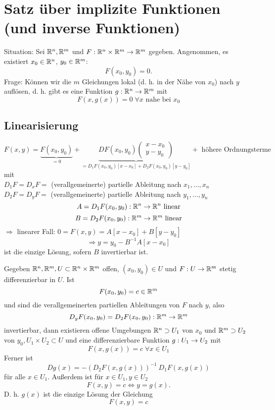 \documentclass[../ana2.tex]{subfiles}
\begin{document}
\setcounter{section}{16}
\section{Satz über implizite Funktionen (und inverse Funktionen)}
Situation: Sei \(\mathbb{R}^n, \mathbb{R}^m\) und \(F:\mathbb{R}^n \times \mathbb{R}^m\rightarrow \mathbb{R}^m\) gegeben. 
Angenommen, es existiert \(x_0 \in \mathbb{R}^n\), \(y_0 \in \mathbb{R}^m\):
\[ F(x_0, y_0) = 0. \]
Frage: Können wir die \( m \) Gleichungen lokal 
(d. h. in der Nähe von \( x_0 \)) nach \(y\) 
auflösen, d. h. gibt es eine Funktion 
\( g:\mathbb{R}^n\rightarrow \mathbb{R}^m \) mit 
\[ F(x, g(x)) = 0 \; \forall x \text{ nahe bei } x_0 \]
\subsection*{Linearisierung} 
\[ F(x,y) = \underbrace{F(x_0, y_0)}_{=0} + \underbrace{DF(x_0, y_0) \begin{pmatrix}
    x - x_0 \\ y - y_0
\end{pmatrix} }_{
    = D_1 F(x_0, y_0)[x - x_0] + D_2 F(x_0, y_0)[y - y_0]
}+ \text{ höhere Ordnungsterme}\]
mit \\
\( D_1 F = D_x F =  \) (verallgemeinerte) 
partielle Ableitung nach \( x_1,\ldots, x_n \)\\
\( D_2F = D_yF = \) (verallgemeinerte) 
partielle Ableitung nach \(y_1, \ldots , y_n \)
\[ A = D_1 F(x_0, y_0):\mathbb{R}^n\rightarrow \mathbb{R}^n \text{ linear} \]
\[ B = D_2 F(x_0, y_0):\mathbb{R}^m\rightarrow \mathbb{R}^m \text{ linear} \]
\( \Rightarrow \) linearer Fall: 
\(0 = F(x, y) = A[x-x_0] + B[y-y_0]\)
\[ \Rightarrow y = y_0 - B^{-1}A[x - x_0] \]
ist die einzige Lösung, sofern \( B \) invertierbar ist.
\begin{satz}
    Gegeben \(\mathbb{R}^n, \mathbb{R}^m, U \subset \mathbb{R}^n \times \mathbb{R}^m\) offen, 
    \((x_0, y_0) \in U\) und \(F:U\rightarrow \mathbb{R}^m\) stetig differenzierbar
    in \(U\). Ist
    \[ F(x_0, y_0) = c \in \mathbb{R}^m \]
    und sind die verallgemeinerten partiellen Ableitungen von \(F\)
    nach \(y\), also
    \[ D_yF(x_0,y_0) = D_2F(x_0, y_0):\mathbb{R}^m\rightarrow \mathbb{R}^m \]
    invertierbar, dann existieren offene Umgebungen \(\mathbb{R}^n \supset U_1\)
    von \(x_0\) und \(\mathbb{R}^m \supset U_2\) von \(y_0, U_1 \times U_2 \subset U\)
    und eine differenzierbare Funktion \(g:U_1\rightarrow U_2\) mit 
    \[F(x, g(x)) = c \; \forall x \in U_1\]
    Ferner ist 
    \[ D g(x) = -(D_2 F(x, g(x)))^{-1} \ D_1 F(x, g(x)) \]
    für alle \( x\in U_1 \). Außerdem ist für \( x \in U_1, y \in U_2 \)
    \[ F(x,y) = c \Leftrightarrow y = g(x). \]
    D. h. \(g(x)\) ist die einzige Lösung der Gleichung
    \[F(x, y) = c\]
\end{satz}
\end{document}
